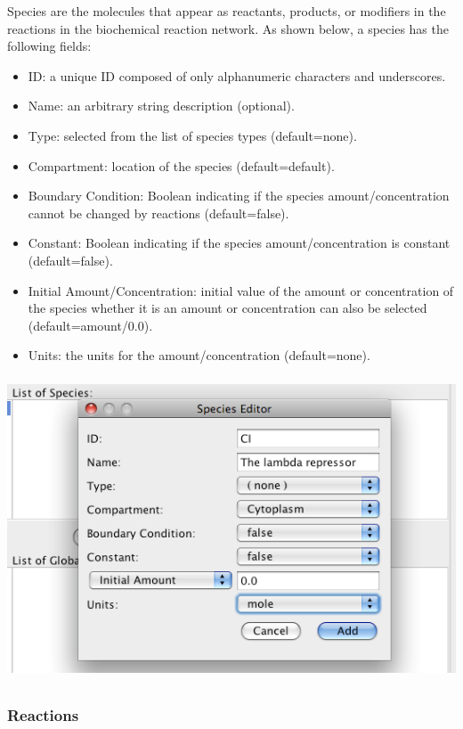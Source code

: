 \documentclass[titlepage,11pt]{article}
\begin{document}
\noindent
Species are the molecules that appear as reactants, products, or modifiers
in the reactions in the biochemical reaction network. 
As shown below, a species has the following fields:
\begin{itemize}
\item ID: a unique ID composed of only alphanumeric characters and 
       underscores.
\item Name: an arbitrary string description (optional).
\item Type: selected from the list of species types (default=none).
\item Compartment: location of the species (default=default).
\item Boundary Condition: Boolean indicating if the species 
       amount/concentration
       cannot be changed by reactions (default=false).
\item Constant: Boolean indicating if the species amount/concentration 
       is constant (default=false).
\item Initial Amount/Concentration: initial value of the amount or 
       concentration of the species whether it is an amount or concentration
       can also be selected (default=amount/0.0).
\item Units: the units for the amount/concentration (default=none).
\end{itemize}
\begin{center}
\includegraphics[height=90mm]{screenshots/species}
\end{center}

\subsubsection{\label{reactions}Reactions}
\end{document}
